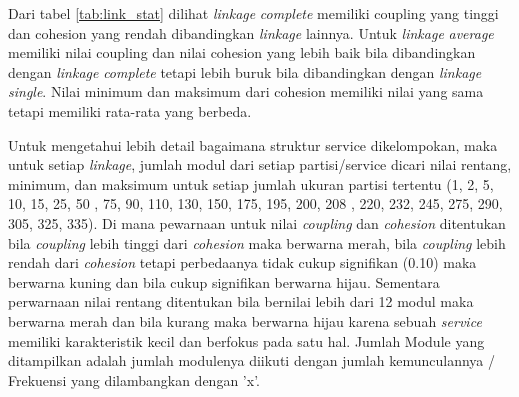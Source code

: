 Dari tabel \ref{tab:link_stat} dilihat \textit{linkage} \textit{complete} memiliki coupling yang tinggi dan cohesion yang rendah dibandingkan \textit{linkage} lainnya. Untuk \textit{linkage} \textit{average} memiliki nilai coupling dan nilai cohesion yang lebih baik  bila dibandingkan dengan \textit{linkage} \textit{complete} tetapi lebih buruk bila dibandingkan dengan \textit{linkage} \textit{single}. Nilai  minimum dan maksimum dari cohesion memiliki nilai yang sama tetapi memiliki rata-rata yang berbeda. 

Untuk mengetahui lebih detail bagaimana struktur service dikelompokan, maka untuk setiap \textit{linkage}, jumlah modul dari setiap partisi/service dicari nilai rentang, minimum, dan maksimum untuk setiap jumlah ukuran partisi tertentu (1, 2, 5, 10, 15, 25, 50 , 75, 90, 110, 130, 150, 175, 195, 200, 208 , 220, 232,  245, 275, 290, 305, 325, 335). Di mana pewarnaan untuk nilai \textit{coupling} dan \textit{cohesion} ditentukan bila \textit{coupling} lebih tinggi dari \textit{cohesion} maka berwarna merah, bila \textit{coupling} lebih rendah dari \textit{cohesion} tetapi perbedaanya tidak cukup signifikan (0.10) maka berwarna kuning dan bila cukup signifikan berwarna hijau. Sementara perwarnaan nilai rentang ditentukan bila bernilai lebih dari 12 modul maka berwarna merah dan bila kurang maka berwarna hijau karena sebuah \textit{service} memiliki karakteristik kecil dan berfokus pada satu hal.  Jumlah Module yang ditampilkan adalah jumlah modulenya diikuti dengan jumlah kemunculannya / Frekuensi yang dilambangkan dengan 'x'.

